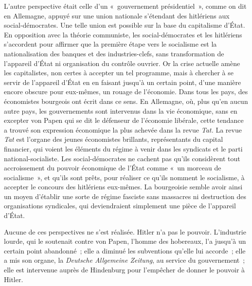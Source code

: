 \documentclass[french,twoside]{book} %
\begin{document}
L'autre perspective était celle d'un « gouvernement présidentiel », comme on dit en Allemagne, appuyé sur une union nationale s'étendant des hitlériens aux social-démocrates. Une telle union est possible sur la base du capitalisme d'État. En opposition avec la théorie communiste, les social-démocrates et les hitlériens s'accordent pour affirmer que la première étape vers le socialisme est la nationalisation des banques et des industries-clefs, sans transformation de l'appareil d'État ni organisation du contrôle ouvrier. Or la crise actuelle amène les capitalistes, non certes à accepter un tel programme, mais à cher­cher à se servir de l'appareil d'État en en faisant jusqu'à un certain point, d'une manière encore obscure pour eux-mêmes, un rouage de l'économie. Dans tous les pays, des économistes bourgeois ont écrit dans ce sens. En Allemagne, où, plus qu'en aucun autre pays, les gouvernements sont intervenus dans la vie économique, sans en excepter von Papen qui se dit le défenseur de l'économie libérale, cette tendance a trouvé son expression économique la plus achevée dans la revue {\itshape Tat.} La revue {\itshape Tat} est l'organe des jeunes économistes brillants, représentants du capital financier, qui voient les éléments du régime à venir dans les syndicats et le parti national-socialiste. Les social-démocrates ne cachent pas qu'ils considèrent tout accroissement du pouvoir économique de l'État comme « un morceau de socialisme », et qu'ils sont prêts, pour réaliser ce qu'ils nomment le socialisme, à accepter le concours des hitlériens eux-mêmes. La bourgeoisie semble avoir ainsi un moyen d'établir une sorte de régime fasciste sans massacres ni destruction des organisations syndicales, qui deviendraient simplement une pièce de l'appareil d'État.\par
Aucune de ces perspectives ne s'est réalisée. Hitler n'a pas le pouvoir. L'industrie lourde, qui le soutenait contre von Papen, l'homme des hobereaux, l'a jusqu'à un certain point abandonné ; elle a diminué les subventions qu'elle lui accorde ; elle a mis son organe, la {\itshape Deutsche Allgemeine Zeitung}, au service du gouvernement ; elle est intervenue auprès de Hindenburg pour l'empêcher de donner le pouvoir à Hitler.\par
\end{document}

